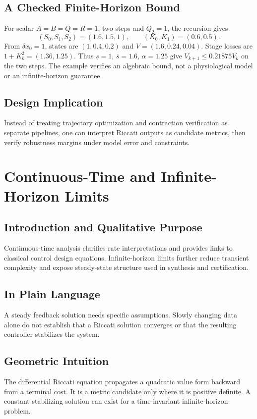 \documentclass[11pt,letterpaper]{article}
\begin{document}
\subsection{A Checked Finite-Horizon Bound}
For scalar $A=B=Q=R=1$, two steps and $Q_2=1$, the recursion gives
\[
(S_0,S_1,S_2)=(1.6,1.5,1),\qquad (K_0,K_1)=(0.6,0.5).
\]
From $\delta x_0=1$, states are $(1,0.4,0.2)$ and $V=(1.6,0.24,0.04)$. Stage losses are $1+K_k^2=(1.36,1.25)$. Thus $\underline s=1$, $\overline s=1.6$, $\alpha=1.25$ give $V_{k+1}\leq0.21875V_k$ on the two steps. The example verifies an algebraic bound, not a physiological model or an infinite-horizon guarantee.

\subsection{Design Implication}
Instead of treating trajectory optimization and contraction verification as separate pipelines, one can interpret Riccati outputs as candidate metrics, then verify robustness margins under model error and constraints.

\section{Continuous-Time and Infinite-Horizon Limits}

\subsection{Introduction and Qualitative Purpose}
Continuous-time analysis clarifies rate interpretations and provides links to classical control design equations. Infinite-horizon limits further reduce transient complexity and expose steady-state structure used in synthesis and certification.

\subsection{In Plain Language}
A steady feedback solution needs specific assumptions. Slowly changing data alone do not establish that a Riccati solution converges or that the resulting controller stabilizes the system.

\subsection{Geometric Intuition}
The differential Riccati equation propagates a quadratic value form backward from a terminal cost. It is a metric candidate only where it is positive definite. A constant stabilizing solution can exist for a time-invariant infinite-horizon problem.
\end{document}
